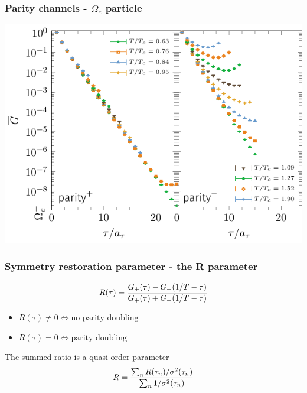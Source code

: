 \documentclass[11pt]{beamer}
\begin{document}
\begin{frame}
  \frametitle{Parity channels - $\Omega_c$ particle}

  \begin{center}
    \hspace*{-10mm}
    \includegraphics[width=\textwidth]{plots/correlator_omega_c.pdf}
  \end{center}

\end{frame}

\begin{frame}
  \frametitle{Symmetry restoration parameter - the R parameter}

  \begin{equation*}
    R(\tau) = \frac{%
      G_+(\tau) - G_+(1/T - \tau)
      }{%
      G_+(\tau) + G_+(1/T - \tau)
    }
  \end{equation*}

  \begin{itemize}
    \item $R(\tau) \neq 0 \Leftrightarrow \text{no parity doubling}$
    \item $R(\tau) = 0 \Leftrightarrow \text{parity doubling}$
  \end{itemize}

  \vspace{5mm}

  The summed ratio is a quasi-order parameter 
  \begin{equation*}
    R = \frac{%
      \sum_n R(\tau_n) / \sigma^2(\tau_n)
      }{%
      \sum_n 1 / \sigma^2(\tau_n)
    }
  \end{equation*}

\end{frame}
\end{document}
